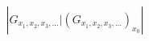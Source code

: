 \documentclass[preview]{standalone}
\begin{document}
\begin{align*}
\left|G_{x_1, x_2, x_3, \dots} | \left(G_{x_1, x_2, x_3, \dots}\right)_{x_0} \right|
\end{align*}
\end{document}
